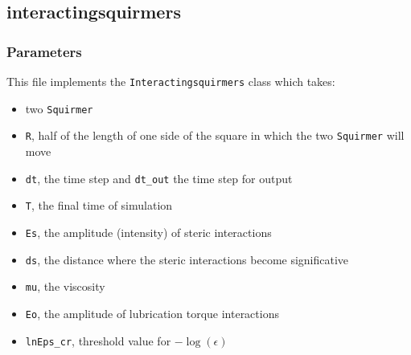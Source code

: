 \documentclass{article}
\begin{document}
\subsection{interactingsquirmers}
\subsubsection*{Parameters}
This file implements the \texttt{Interactingsquirmers} class which takes:
\begin{itemize}
   \item two \texttt{Squirmer}
   \item \texttt{R}, half of the length of one side of the square in which the two \texttt{Squirmer} will move
   \item \texttt{dt}, the time step and \texttt{dt\_out} the time step for output
   \item \texttt{T}, the final time of simulation
   \item \texttt{Es}, the amplitude (intensity) of steric interactions
   \item \texttt{ds}, the distance where the steric interactions become significative
   \item \texttt{mu}, the viscosity
   \item \texttt{Eo}, the amplitude of lubrication torque interactions
   \item \texttt{lnEps\_cr}, threshold value for \( -\log(\epsilon) \)
\end{itemize}
\end{document}
